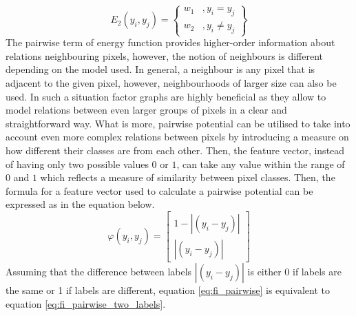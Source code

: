 \begin{equation}
 \label{eq:energy_pairwise}
    E_2(y_i,y_j)=\begin{Bmatrix}
     w_1 & , y_i=y_j \\ 
     w_2 & , y_i \neq y_j
    \end{Bmatrix}
\end{equation}
The pairwise term of energy function provides higher-order information about relations neighbouring pixels, however, the notion of neighbours is different depending on the model used. In general, a neighbour is any pixel that is adjacent to the given pixel, however, neighbourhoods of larger size can also be used. In such a situation factor graphs are highly beneficial as they allow to model relations between even larger groups of pixels in a clear and straightforward way. What is more, pairwise potential can be utilised to take into account even more complex relations between pixels by introducing a measure on how different their classes are from each other. Then, the feature vector, instead of having only two possible values $0$ or $1$, can take any value within the range of $0$ and $1$ which reflects a measure of similarity between pixel classes. Then, the formula for a feature vector used to calculate a pairwise potential can be expressed as in the equation below.
\begin{equation}
    \label{eq:fi_pairwise}
    \varphi(y_i,y_j) = \begin{bmatrix}
        1 - \left | (y_i - y_j) \right | \\
        \left | (y_i - y_j) \right |
    \end{bmatrix}
\end{equation}
Assuming that the difference between labels $\left | (y_i - y_j) \right |$ is either 0 if labels are the same or 1 if labels are different, equation \ref{eq:fi_pairwise} is equivalent to equation \ref{eq:fi_pairwise_two_labels}.

